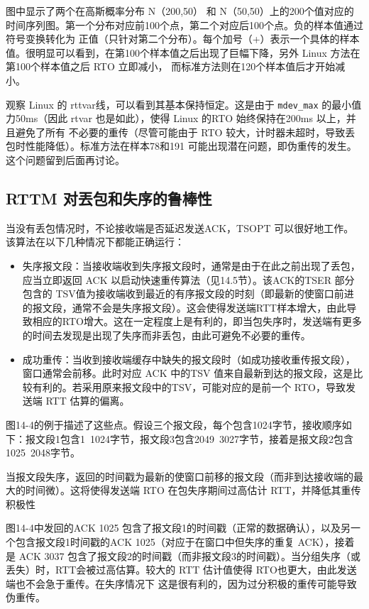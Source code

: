 图中显示了两个在高斯概率分布 N（200,50） 和
N（50,50）上的200个值对应的时间序列图。第一个分布对应前100个点，第二个对应后100个点。负的样本值通过符号变换转化为
正值（只针对第二个分布）。每个加号（+）表示一个具体的样本值。很明显可以看到，在第100个样本值之后出现了巨幅下降，另外 Linux
方法在第100个样本值之后 RTO 立即减小，
而标准方法则在120个样本值后才开始减小。

观察 Linux 的 rttvar线，可以看到其基本保持恒定。这是由于 \verb|mdev_max| 的最小值力50ms（因此
rtvar 也是如此），使得 Linux 的RTO 始终保持在200ms 以上，并且避免了所有
不必要的重传（尽管可能由于 RTO 较大，计时器未超时，导致丢包时性能降低）。标准方法在样本78和191
可能出现潜在问题，即伪重传的发生。这个问题留到后面再讨论。

\subsection{RTTM 对丟包和失序的鲁棒性}

当没有丢包情况时，不论接收端是否延迟发送ACK，TSOPT 可以很好地工作。该算法在以下几种情况下都能正确运行：
\begin{itemize}
\item 失序报文段：当接收端收到失序报文段时，通常是由于在此之前出现了丢包，应当立即返回 ACK
以启动快速重传算法（见14.5节）。该ACK的TSER 部分包含的
TSV值为接收端收到最近的有序报文段的时刻（即最新的使窗口前进的报文段，通常不会是失序报文段）。这会使得发送端RTT样本增大，由此导致相应的RTO增大。这在一定程度上是有利的，即当包失序时，发送端有更多的时间去发现是出现了失序而非丢包，由此可避免不必要的重传。
\item 成功重传：当收到接收端缓存中缺失的报文段时（如成功接收重传报文段），窗口通常会前移。此时对应 ACK 中的TSV
值来自最新到达的报文段，这是比较有利的。若采用原来报文段中的TSV，可能对应的是前一个 RTO，导致发送端 RTT 估算的偏离。
\end{itemize}

图14-4的例于描述了这些点。假设三个报文段，每个包含1024字节，接收顺序如下：报文段1包含1~1024字节，报文段3包含2049~3027字节，接着是报文段2包含1025~2048字节。

当报文段失序，返回的时间戳为最新的使窗口前移的报文段（而非到达接收端的最大的时间微）。这将使得发送端 RTO 在包失序期间过高估计 RTT，并降低其重传积极性

图14-4中发回的ACK 1025 包含了报文段1的时间戳（正常的数据确认），以及另一个包含报文段1时间戳的ACK
1025（对应于在窗口中但失序的重复 ACK），接着是 ACK 3037
包含了报文段2的时间戳（而非报文段3的时间戳）。当分组失序（或丢失）时，RTT会被过高估算。较大的 RTT 估计值使得
RTO也更大，由此发送端也不会急于重传。在失序情况下
这是很有利的，因为过分积极的重传可能导致伪重传。

